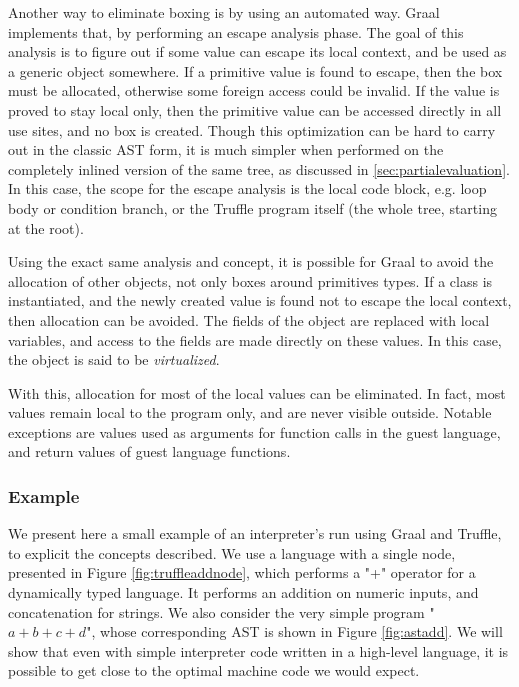 \documentclass[twoside,11pt,a4paper]{article}
\begin{document}
Another way to eliminate boxing is by using an automated way. Graal implements that, by performing an escape analysis phase. The goal of this analysis is to figure out if some value can escape its local context, and be used as a generic object somewhere. If a primitive value is found to escape, then the box must be allocated, otherwise some foreign access could be invalid. If the value is proved to stay local only, then the primitive value can be accessed directly in all use sites, and no box is created. Though this optimization can be hard to carry out in the classic AST form, it is much simpler when performed on the completely inlined version of the same tree, as discussed in \ref{sec:partialevaluation}. In this case, the scope for the escape analysis is the local code block, e.g. loop body or condition branch, or the Truffle program itself (the whole tree, starting at the root).

Using the exact same analysis and concept, it is possible for Graal to avoid the allocation of other objects, not only boxes around primitives types. If a class is instantiated, and the newly created value is found not to escape the local context, then allocation can be avoided. The fields of the object are replaced with local variables, and access to the fields are made directly on these values. In this case, the object is said to be \textit{virtualized}.

With this, allocation for most of the local values can be eliminated. In fact, most values remain local to the program only, and are never visible outside. Notable exceptions are values used as arguments for function calls in the guest language, and return values of guest language functions.

\subsubsection{Example}

We present here a small example of an interpreter's run using Graal and Truffle, to explicit the concepts described. We use a language with a single node, presented in Figure \ref{fig:truffleaddnode}, which performs a "+" operator for a dynamically typed language. It performs an addition on numeric inputs, and concatenation for strings. We also consider the very simple program "$a + b + c + d$", whose corresponding AST is shown in Figure \ref{fig:astadd}. We will show that even with simple interpreter code written in a high-level language, it is possible to get close to the optimal machine code we would expect.
\end{document}
